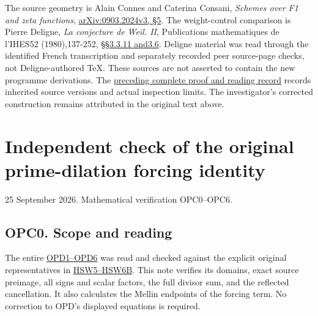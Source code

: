 The source geometry is Alain Connes and Caterina Consani, \emph{Schemes
over F1 and zeta functions},
\href{https://arxiv.org/abs/0903.2024v3}{arXiv:0903.2024v3, §5}. The
weight-control comparison is Pierre Deligne, \emph{La conjecture de
Weil. II}, Publications mathematiques de l'IHES52 (1980),137-252,
\href{https://www.numdam.org/item/PMIHES_1980__52__137_0/}{§§3.3.11
and3.6}. Deligne material was read through the identified French
transcription and separately recorded peer source-page checks, not
Deligne-authored TeX. These sources are not asserted to contain the new
programme derivations. The
\href{https://github.com/KokunoYumeto/zeta-function-research-reader/blob/36a82ecca98addb8a98b48204e349737856c7223/workbenches/splitzero-tandem/continuations/20260924-cohomology-weight-and-character-lifts/BUILD_AND_REVIEW.md}{preceding
complete proof and reading record} records inherited source versions and
actual inspection limits. The investigator's corrected construction
remains attributed in the original text above.

\chapter{Independent check of the original prime-dilation forcing
identity}\label{independent-check-of-the-original-prime-dilation-forcing-identity}

25 September 2026. Mathematical verification OPC0--OPC6.

\section{OPC0. Scope and reading}\label{opc0.-scope-and-reading}

The entire
\href{https://github.com/KokunoYumeto/zeta-function-research-reader/blob/main/workbenches/splitzero-tandem/continuations/20260925-full-source-tensor-and-original-divisor/counterfactual/ORIGINAL_PRIME_DILATION_FORCING_IDENTITY.md}{OPD1--OPD6}
was read and checked against the explicit original representatives in
\href{https://github.com/KokunoYumeto/zeta-function-research-reader/blob/main/workbenches/splitzero-tandem/continuations/20260925-full-source-tensor-and-original-divisor/counterfactual/ORIGINAL_ZETA_HARMONIC_SWEEP_AND_OFFCRITICAL_DEFECT.md}{HSW5--HSW6B}.
This note verifies its domains, exact source preimage, all signs and
scalar factors, the full divisor sum, and the reflected cancellation. It
also calculates the Mellin endpoints of the forcing term. No correction
to OPD's displayed equations is required.


